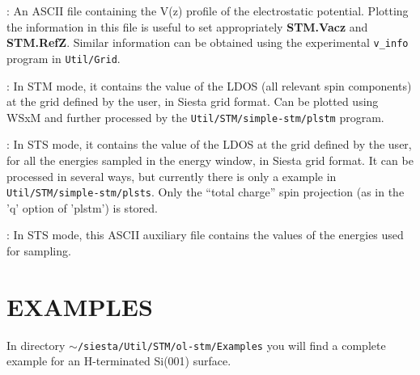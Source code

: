 \begin{description}
\itemsep 10pt
\parsep 0pt

\item[{\bf {\it SystemLabel}.v\_ave\_z}]: An ASCII file containing the
  V(z) profile of the electrostatic potential. Plotting the
  information in this file is useful to set appropriately {\bf
    STM.Vacz} and {\bf STM.RefZ}.  Similar information can be obtained
  using the experimental {\tt v\_info} program in {\tt Util/Grid}.
  
\item[{\bf {\it SystemLabel}.STM.LDOS}]: In STM mode, it contains the
  value of the LDOS (all relevant spin components) at the grid defined
  by the user, in {\sc Siesta} grid format. Can be plotted using WSxM
  and further processed by the {\tt Util/STM/simple-stm/plstm}
  program.

\item[{\bf {\it SystemLabel}.STS}]: In STS mode, it contains the value
  of the LDOS at the grid defined by the user, for all the energies
  sampled in the energy window, in {\sc Siesta} grid format. It can be
  processed in several ways, but currently there is only a example in
  {\tt Util/STM/simple-stm/plsts}. Only the ``total charge'' spin
  projection (as in the 'q' option of 'plstm') is stored.

\item[{\bf {\it SystemLabel}.STS\_AUX}]: In STS mode, this ASCII auxiliary
  file contains the values of the energies used for sampling.

\end{description}



\section{EXAMPLES}

In directory {\tt $\sim$/siesta/Util/STM/ol-stm/Examples} you will
find a complete example for an H-terminated Si(001) surface.


